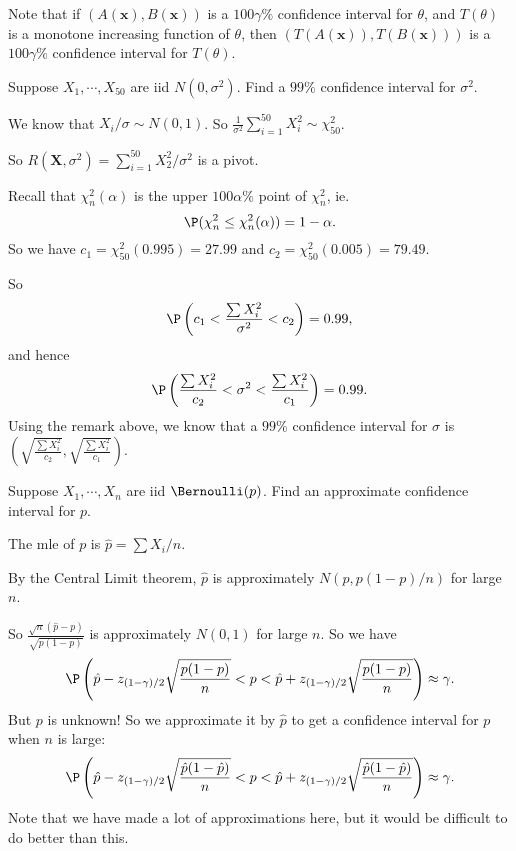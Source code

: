 \documentclass[a4paper]{article}
\begin{document}
Note that if $(A(\mathbf{x}), B(\mathbf{x}))$ is a $100\gamma\%$ confidence interval for $\theta$, and $T(\theta)$ is a monotone increasing function of $\theta$, then $(T(A(\mathbf{x})), T(B(\mathbf{x})))$ is a $100\gamma\%$ confidence interval for $T(\theta)$.
\begin{eg}
  Suppose $X_1, \cdots, X_{50}$ are iid $N(0, \sigma^2)$. Find a $99\%$ confidence interval for $\sigma^2$.

  We know that $X_i/\sigma \sim N(0, 1)$. So $\displaystyle\frac{1}{\sigma^2}\sum_{i = 1}^{50}X_i^2 \sim \chi^2_{50}$.

  So $R(\mathbf{X}, \sigma^2) = \sum_{i = 1}^{50} X_2^2/\sigma^2$ is a pivot.

  Recall that $\chi_n^2(\alpha)$ is the upper $100\alpha\%$ point of $\chi_n^2$, ie.
  \[
    \P(\chi_n^2 \leq \chi_n^2(\alpha)) = 1 - \alpha.
  \]
  So we have $c_1 = \chi_{50}^2(0.995) = 27.99$ and $c_2 = \chi_{50}^2(0.005) = 79.49$.

  So
  \[
    \P \left(c_1 < \frac{\sum X_i^2}{\sigma^2} < c_2\right) = 0.99,
  \]
  and hence
  \[
    \P\left(\frac{\sum X_i^2}{c_2} < \sigma^2 < \frac{\sum X_i^2}{c_1}\right) = 0.99.
  \]
  Using the remark above, we know that a $99\%$ confidence interval for $\sigma$ is $\left(\sqrt{\frac{\sum X_i^2}{c_2}}, \sqrt{\frac{\sum X_i^2}{c_1}}\right)$.
\end{eg}

\begin{eg}
  Suppose $X_1, \cdots, X_n$ are iid $\Bernoulli(p)$. Find an approximate confidence interval for $p$.

  The mle of $p$ is $\hat p = \sum X_i/n$.

  By the Central Limit theorem, $\hat{p}$ is approximately $N(p, p(1 - p)/n)$ for large $n$.

  So $\displaystyle \frac{\sqrt{n}(\hat{p} - p)}{\sqrt{p(1 - p)}}$ is approximately $N(0, 1)$ for large $n$. So we have
  \[
    \P\left(\hat p - z_{(1 - \gamma)/2}\sqrt{\frac{p(1 - p)}{n}} < p < \hat{p} + z_{(1 - \gamma)/2}\sqrt{\frac{p(1 - p)}{n}}\right)\approx \gamma.
  \]
  But $p$ is unknown! So we approximate it by $\hat{p}$ to get a confidence interval for $p$ when $n$ is large:
  \[
    \P\left(\hat p - z_{(1 - \gamma)/2}\sqrt{\frac{\hat p(1 - \hat p)}{n}} < p < \hat{p} + z_{(1 - \gamma)/2}\sqrt{\frac{\hat p(1 - \hat p)}{n}}\right)\approx \gamma.
  \]
  Note that we have made a lot of approximations here, but it would be difficult to do better than this.
\end{eg}
\end{document}

